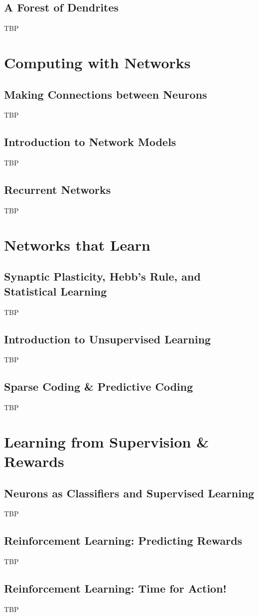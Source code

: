 \documentclass[]{article}
\begin{document}
\subsection{A Forest of Dendrites}\label{sec:a:forest:of:neurons}
TBP

\section{Computing with Networks}\label{sec:week6}

\subsection{Making Connections between Neurons}
TBP

\subsection{Introduction to Network Models}
TBP

\subsection{Recurrent Networks}
TBP

\section{Networks that Learn}\label{sec:week7}

\subsection{Synaptic Plasticity, Hebb's Rule, and Statistical Learning}
TBP

\subsection{Introduction to Unsupervised Learning}
TBP

\subsection{Sparse Coding \& Predictive Coding}
TBP

\section{Learning from Supervision \& Rewards}\label{sec:week8}

\subsection{Neurons as Classifiers and Supervised Learning}
TBP

\subsection{Reinforcement Learning: Predicting Rewards}
TBP

\subsection{Reinforcement Learning: Time for Action!}
TBP

\appendix

\printglossaries




\end{document}
